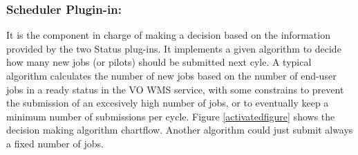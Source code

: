 \documentclass[a4paper]{jpconf}
\begin{document}
\subsubsection{Scheduler Plugin-in:}
It is the component in charge of making a decision based on the information provided by the two Status plug-ins. 
It implements a given algorithm to decide how many new jobs (or pilots) should be submitted next cyle. 
A typical algorithm calculates the number of new jobs based on the number of end-user jobs in a ready status in the VO WMS service, 
with some constrains to prevent the submission of an excesively high number of jobs, 
or to eventually keep a minimum number of submissions per cycle. 
Figure \ref{activatedfigure} shows the decision making algorithm chartflow. 
Another algorithm could just submit always a fixed number of jobs.
\end{document}
